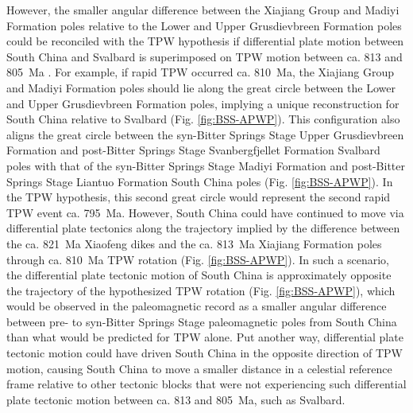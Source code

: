 However, the smaller angular difference between the Xiajiang Group and Madiyi Formation poles relative to the Lower and Upper Grusdievbreen Formation poles could be reconciled with the TPW hypothesis if differential plate motion between South China and Svalbard is superimposed on TPW motion between ca. 813 and 805~Ma \citep{Evans2003a}. For example, if rapid TPW occurred ca. 810~Ma, the Xiajiang Group and Madiyi Formation poles should lie along the great circle between the Lower and Upper Grusdievbreen Formation poles, implying a unique reconstruction for South China relative to Svalbard (Fig. \ref{fig:BSS-APWP}). This configuration also aligns the great circle between the syn-Bitter Springs Stage Upper Grusdievbreen Formation and post-Bitter Springs Stage Svanbergfjellet Formation Svalbard poles with that of the syn-Bitter Springs Stage Madiyi Formation and post-Bitter Springs Stage Liantuo Formation South China poles (Fig. \ref{fig:BSS-APWP}). In the TPW hypothesis, this second great circle would represent the second rapid TPW event ca. 795~Ma. However, South China could have continued to move via differential plate tectonics along the trajectory implied by the difference between the ca. 821~Ma Xiaofeng dikes and the ca. 813~Ma Xiajiang Formation poles through ca. 810~Ma TPW rotation (Fig. \ref{fig:BSS-APWP}). In such a scenario, the differential plate tectonic motion of South China is approximately opposite the trajectory of the hypothesized TPW rotation (Fig. \ref{fig:BSS-APWP}), which would be observed in the paleomagnetic record as a smaller angular difference between pre- to syn-Bitter Springs Stage paleomagnetic poles from South China than what would be predicted for TPW alone. Put another way, differential plate tectonic motion could have driven South China in the opposite direction of TPW motion, causing South China to move a smaller distance in a celestial reference frame relative to other tectonic blocks that were not experiencing such differential plate tectonic motion between ca. 813 and 805~Ma, such as Svalbard.

